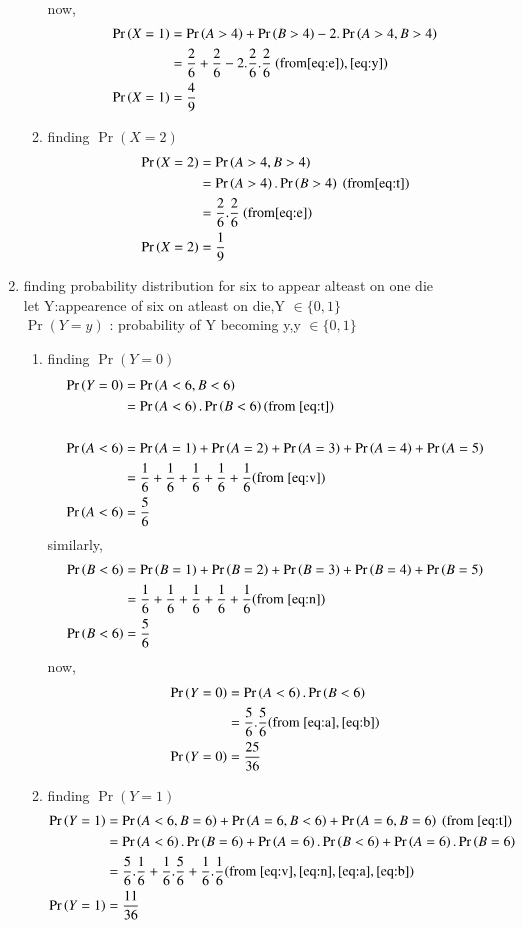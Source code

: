 \documentclass[journal,12pt,onecolumn]{IEEEtran}
\providecommand{\pr}[1]{\ensuremath{\Pr\left(#1\right)}}
\theoremstyle{remark}
\begin{document}
\begin{enumerate}
\begin{enumerate}
\begin{align}
\end{align}
now,
\begin{align}
\pr{X=1}&=\pr{A>4}+\pr{B>4}-2.\pr{A>4,B>4}\\
&=\frac{2}{6}+\frac{2}{6}-2.\frac{2}{6}.\frac{2}{6} \ (\text{from} \eqref{eq:e}),\eqref{eq:y})\\
\pr{X=1}&=\frac{4}{9}
\end{align}
\item finding $\pr{X=2}$
\begin{align}
\pr{X=2}&=\pr{A>4,B>4}\\
&=\pr{A>4}.\pr{B>4}\  (\text{from} \eqref{eq:t})\\
&= \frac{2}{6}.\frac{2}{6} \ (\text{from} \eqref{eq:e})\\
\pr{X=2}&=\frac{1}{9}
\end{align}
\end{enumerate}
\item finding probability distribution for six to appear alteast on one die\\
let Y:appearence of six on atleast on die,Y $\in \{ 0,1\}$ \\
$\pr{Y=y}$ : probability of Y becoming y,y $\in \{ 0,1\}$
\begin{enumerate}
\item finding $\pr{Y=0}$
\begin{align}
\pr{Y=0}&=\pr{A<6,B<6}\\
&=\pr{A<6}.\pr{B<6} (\text{from } \eqref{eq:t})\\\\
\pr{A<6}&=\pr{A=1}+\pr{A=2}+\pr{A=3}+\pr{A=4}+\pr{A=5} \\
&=\frac{1}{6}+\frac{1}{6}+\frac{1}{6}+\frac{1}{6}+\frac{1}{6} (\text{from } \eqref{eq:v}) \\
\pr{A<6}&=\frac{5}{6} \label{eq:a}
\end{align}
similarly,
\begin{align}
\pr{B<6}&=\pr{B=1}+\pr{B=2}+\pr{B=3}+\pr{B=4}+\pr{B=5}\\
&=\frac{1}{6}+\frac{1}{6}+\frac{1}{6}+\frac{1}{6}+\frac{1}{6} (\text{from } \eqref{eq:n})\\
\pr{B<6}&=\frac{5}{6} \label{eq:b}
\end{align}
now,
\begin{align}
\pr{Y=0}&=\pr{A<6}.\pr{B<6}\\
&=\frac{5}{6}.\frac{5}{6}  (\text{from } \eqref{eq:a},\eqref{eq:b})\\
\pr{Y=0}&=\frac{25}{36}
\end{align}
\item finding $\pr{Y=1}$
\begin{align}
\pr{Y=1}&=\pr{A<6,B=6}+\pr{A=6,B<6}+\pr{A=6,B=6} \  (\text{from } \eqref{eq:t})\\
&=\pr{A<6}.\pr{B=6}+\pr{A=6}.\pr{B<6}+\pr{A=6}.\pr{B=6}\\
&=\frac{5}{6}.\frac{1}{6}+\frac{1}{6}.\frac{5}{6}+\frac{1}{6}.\frac{1}{6}  (\text{from }\eqref{eq:v},\eqref{eq:n},\eqref{eq:a},\eqref{eq:b} )\\
\pr{Y=1}&=\frac{11}{36}
\end{align}
\end{enumerate}
\end{enumerate}
\end{document}
